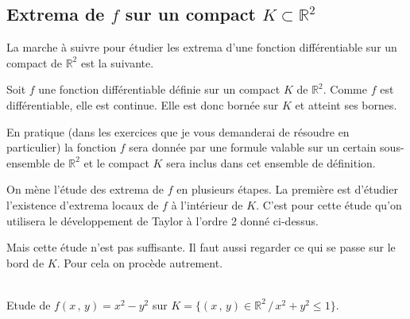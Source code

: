 \documentclass[class=report,crop=false]{standalone}
\begin{document}
{{{{{{{{{{{{{{\subsection{Extrema de $f$ sur un compact $K \subset \mathbb{R}^2$}

La marche \`a suivre pour étudier les extrema d'une fonction différentiable sur un compact de $\mathbb{R}^2$ est la suivante.

Soit $f$ une fonction différentiable définie sur un compact $K$ de $\mathbb{R}^2$. Comme $f$ est différentiable, elle est continue. Elle est donc bornée sur $K$ et atteint ses bornes.

En pratique (dans les exercices que je vous demanderai de résoudre en particulier) la fonction $f$ sera donnée par une formule valable sur un certain sous-ensemble de $\mathbb{R}^2$ et le compact $K$ sera inclus dans cet ensemble de définition.

On m\`ene l'étude des extrema de $f$ en plusieurs étapes. La premi\`ere est d'étudier l'existence d'extrema locaux de $f$ \`a l'intérieur de $K$. C'est pour cette étude qu'on utilisera le développement de Taylor \`a l'ordre 2 donné ci-dessus.

Mais cette étude n'est pas suffisante. Il faut aussi regarder ce qui se passe sur le bord de $K$. Pour cela on proc\`ede autrement.

\\
Etude de $f(x\,,\,y) = x^2 - y^2$ sur $K = \lbrace (x\,,\,y) \in \mathbb{R}^2 \,/\, x^2 + y^2 \leqslant 1 \rbrace$.
}}}}}}}}}}}}}}
\end{document}
